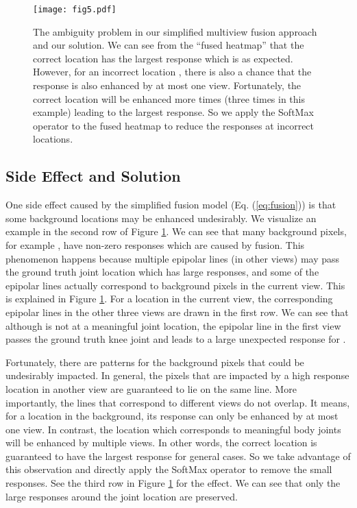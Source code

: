 \begin{figure}
    \centering
    \texttt{[image: fig5.pdf]}
    \caption{The ambiguity problem in our simplified multiview fusion approach and our solution. We can see from the ``fused heatmap'' that the correct location has the largest response which is as expected. However, for an incorrect location , there is also a chance that the response is also enhanced by at most one view. Fortunately, the correct location will be enhanced more times (three times in this example) leading to the largest response. So we apply the SoftMax operator to the fused heatmap to reduce the responses at incorrect locations.}
    \label{fig:ambiguity}
\end{figure}




\subsection{Side Effect and Solution}
\label{sec:side}
One side effect caused by the simplified fusion model (\ie Eq. (\ref{eq:fusion})) is that some background locations may be enhanced undesirably. We visualize an example in the second row of Figure \ref{fig:ambiguity}. We can see that many background pixels, for example , have non-zero responses which are caused by fusion. This phenomenon happens because multiple epipolar lines (in other views) may pass the ground truth joint location which has large responses, and some of the epipolar lines actually correspond to background pixels in the current view. This is explained in Figure \ref{fig:ambiguity}. For a location  in the current view, the corresponding epipolar lines in the other three views are drawn in the first row. We can see that although  is not at a meaningful joint location, the epipolar line in the first view passes the ground truth knee joint and leads to a large unexpected response for .

Fortunately, there are patterns for the background pixels that could be undesirably impacted. In general, the pixels that are impacted by a high response location in another view are guaranteed to lie on the same line. More importantly, the lines that correspond to different views do not overlap. It means, for a location  in the background, its response can only be enhanced by at most one view. In contrast, the location which corresponds to meaningful body joints will be enhanced by multiple views. In other words, the correct location is guaranteed to have the largest response for general cases. So we take advantage of this observation and directly apply the SoftMax operator to remove the small responses. See the third row in Figure \ref{fig:ambiguity} for the effect. We can see that only the large responses around the joint location are preserved.

